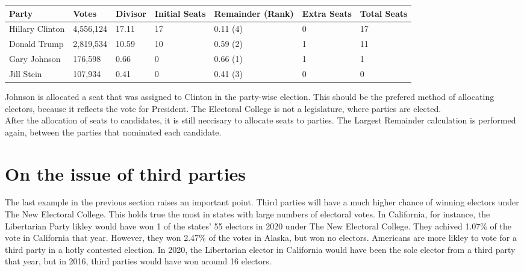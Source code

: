 \documentclass{article}
\begin{document}
    \begin{adjustbox}{center}
    \begin{tabular}{ |l|l|l|l|l|l|l| }
        \hline
        Party & Votes & Divisor & Initial Seats & Remainder (Rank) & Extra Seats & Total Seats \\
        \hline
        Hillary Clinton & 4,556,124 & 17.11 & 17 & 0.11 (4) & 0 & 17 \\
        \hline
        Donald Trump & 2,819,534 & 10.59 & 10 & 0.59 (2) & 1 & 11 \\
        \hline
        Gary Johnson & 176,598 & 0.66 & 0 & 0.66 (1) & 1 & 1 \\
        \hline
        Jill Stein & 107,934 & 0.41 & 0 & 0.41 (3) & 0 & 0 \\
        \hline
    \end{tabular}
    \end{adjustbox}

    Johnson is allocated a seat that was assigned to Clinton in the party-wise election. This should be the prefered method of allocating electors, because it reflects the vote for President. The Electoral College is not a legislature, where parties are elected.\\
    
    After the allocation of seats to candidates, it is still neccisary to allocate seats to parties. The Largest Remainder calculation is performed again, between the parties that nominated each candidate.\\

    \section{On the issue of third parties}%

    The last example in the previous section raises an important point. Third parties will have a much higher chance of winning electors under The New Electoral College. This holds true the most in states with large numbers of electoral votes. In California, for instance, the Libertarian Party likley would have won 1 of the states' 55 electors in 2020 under The New Electoral College. They achived 1.07\% of the vote in California that year. However, they won 2.47\% of the votes in Alaska, but won no electors. Americans are more likley to vote for a third party in a hotly contested election. In 2020, the Libertarian elector in California would have been the sole elector from a third party that year, but in 2016, third parties would have won around 16 electors.\\
\end{document}
